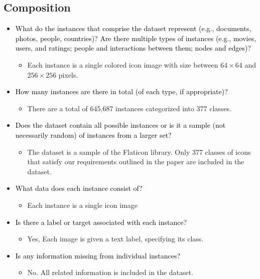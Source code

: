 \documentclass{article}
\newcommand{\ques}[1]{\textcolor{black}{#1}}
\begin{document}
\subsection{Composition}

\begin{itemize}
    \item \ques{What do the instances that comprise the dataset represent (e.g.,
documents, photos, people, countries)? Are there multiple types of
instances (e.g., movies, users, and ratings; people and interactions between them; nodes and edges)?}
    \begin{itemize}
        \item Each instance is a single colored icon image with size between $64 \times 64$ and $256 \times 256$ pixels.
    \end{itemize}
    \item \ques{How many instances are there in total (of each type, if appropriate)?}
    \begin{itemize}
        \item There are a total of 645,687 instances categorized into 377 classes.
    \end{itemize}
    \item \ques{Does the dataset contain all possible instances or is it a sample
(not necessarily random) of instances from a larger set?}
    \begin{itemize}
        \item The dataset is a sample of the Flaticon library. Only 377 classes of icons that satisfy our requirements outlined in the paper are included in the dataset.
    \end{itemize}
    \item \ques{What data does each instance consist of? }
    \begin{itemize}
        \item Each instance is a single icon image
    \end{itemize}
    \item \ques{Is there a label or target associated with each instance?}
    \begin{itemize}
        \item Yes, Each image is given a text label, specifying its class.
    \end{itemize}
    \item \ques{Is any information missing from individual instances?}
    \begin{itemize}
        \item No. All related information is included in the dataset.

\end{itemize}
\end{itemize}
\end{document}
